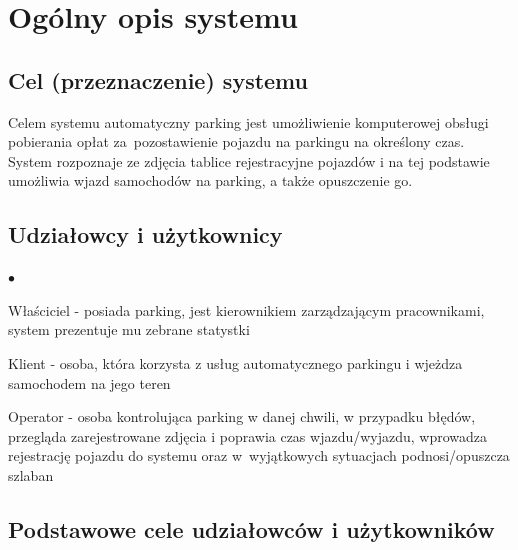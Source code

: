 \chapter{Ogólny opis systemu}
\label{cha:wprowadzenie}


\section{Cel (przeznaczenie) systemu}
\label{sec:celePracy}

Celem systemu automatyczny parking jest umożliwienie komputerowej obsługi pobierania opłat za~pozostawienie pojazdu na parkingu na określony czas. System rozpoznaje ze zdjęcia tablice rejestracyjne pojazdów i na tej podstawie umożliwia wjazd samochodów na parking, a także opuszczenie go.

\section{Udziałowcy i użytkownicy}

\begin{list}{$\bullet$}{}
\item Właściciel - posiada parking, jest kierownikiem zarządzającym pracownikami, system prezentuje mu zebrane statystki
\item Klient - osoba, która korzysta z usług automatycznego parkingu i wjeżdza samochodem na jego teren
\item Operator - osoba kontrolująca parking w danej chwili, w przypadku błędów, przegląda zarejestrowane zdjęcia i poprawia czas wjazdu/wyjazdu, wprowadza rejestrację pojazdu do systemu oraz w~wyjątkowych sytuacjach podnosi/opuszcza szlaban

\end{list}

\section{Podstawowe cele udziałowców i użytkowników}

